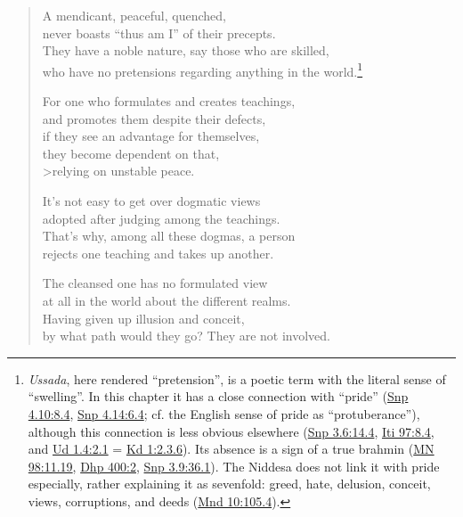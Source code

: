 \documentclass[12pt,openany]{book}%
\begin{document}
\begin{verse}
A mendicant, peaceful, quenched, \\
never boasts “thus am I” of their precepts. \\
They have a noble nature, say those who are skilled, \\
who have no pretensions regarding anything in the world.\footnote{\textit{Ussada}, here rendered “pretension”, is a poetic term with the literal sense of “swelling”. In this chapter it has a close connection with “pride” (\href{https://suttacentral.net/snp4.10/en/sujato\#8.4}{Snp 4.10:8.4}, \href{https://suttacentral.net/snp4.14/en/sujato\#6.4}{Snp 4.14:6.4}; cf. the English sense of pride as “protuberance”), although this connection is less obvious elsewhere (\href{https://suttacentral.net/snp3.6/en/sujato\#14.4}{Snp 3.6:14.4}, \href{https://suttacentral.net/iti97/en/sujato\#8.4}{Iti 97:8.4}, and \href{https://suttacentral.net/ud1.4/en/sujato\#2.1}{Ud 1.4:2.1} = \href{https://suttacentral.net/pli-tv-kd1/en/sujato\#2.3.6}{Kd 1:2.3.6}). Its absence is a sign of a true brahmin (\href{https://suttacentral.net/mn98/en/sujato\#11.19}{MN 98:11.19}, \href{https://suttacentral.net/dhp400/en/sujato\#2}{Dhp 400:2}, \href{https://suttacentral.net/snp3.9/en/sujato\#36.1}{Snp 3.9:36.1}). The Niddesa does not link it with pride especially, rather explaining it as sevenfold: greed, hate, delusion, conceit, views, corruptions, and deeds (\href{https://suttacentral.net/mnd10/en/sujato\#105.4}{Mnd 10:105.4}). } 

For one who formulates and creates teachings, \\
and promotes them despite their defects, \\
if they see an advantage for themselves, \\
they become dependent on that, \\>relying on unstable peace. 

It’s not easy to get over dogmatic views \\
adopted after judging among the teachings. \\
That’s why, among all these dogmas, a person \\
rejects one teaching and takes up another. 

The cleansed one has no formulated view \\
at all in the world about the different realms. \\
Having given up illusion and conceit, \\
by what path would they go? They are not involved. 


\end{verse}
\end{document}
